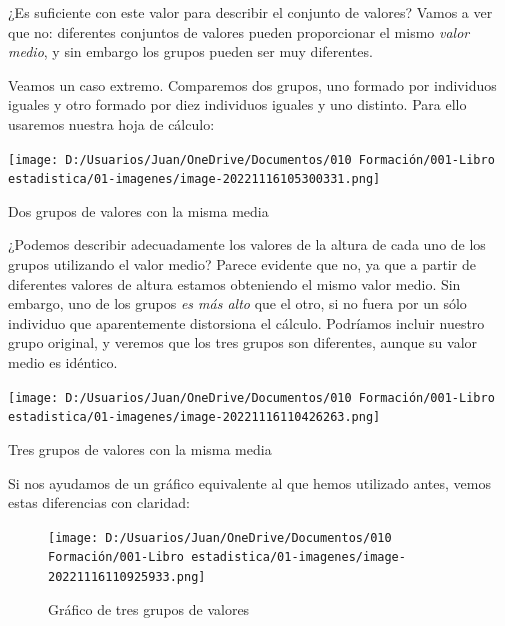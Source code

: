 \documentclass[
  letterpaper,
  DIV=11,
  numbers=noendperiod,
  oneside]{scrreprt}
\begin{document}
¿Es suficiente con este valor para describir el conjunto de valores?
Vamos a ver que no: diferentes conjuntos de valores pueden proporcionar
el mismo \emph{valor medio}, y sin embargo los grupos pueden ser muy
diferentes.

Veamos un caso extremo. Comparemos dos grupos, uno formado por
individuos iguales y otro formado por diez individuos iguales y uno
distinto. Para ello usaremos nuestra hoja de cálculo:

\begin{marginfigure}

{\centering \texttt{[image: D:/Usuarios/Juan/OneDrive/Documentos/010 Formación/001-Libro estadistica/01-imagenes/image-20221116105300331.png]}

}

\caption{Dos grupos de valores con la misma media}

\end{marginfigure}

¿Podemos describir adecuadamente los valores de la altura de cada uno de
los grupos utilizando el valor medio? Parece evidente que no, ya que a
partir de diferentes valores de altura estamos obteniendo el mismo valor
medio. Sin embargo, uno de los grupos \emph{es más alto} que el otro, si
no fuera por un sólo individuo que aparentemente distorsiona el cálculo.
Podríamos incluir nuestro grupo original, y veremos que los tres grupos
son diferentes, aunque su valor medio es idéntico.

\begin{marginfigure}

{\centering \texttt{[image: D:/Usuarios/Juan/OneDrive/Documentos/010 Formación/001-Libro estadistica/01-imagenes/image-20221116110426263.png]}

}

\caption{Tres grupos de valores con la misma media}

\end{marginfigure}

Si nos ayudamos de un gráfico equivalente al que hemos utilizado antes,
vemos estas diferencias con claridad:

\begin{figure}

{\centering \texttt{[image: D:/Usuarios/Juan/OneDrive/Documentos/010 Formación/001-Libro estadistica/01-imagenes/image-20221116110925933.png]}

}

\caption{Gráfico de tres grupos de valores}

\end{figure}
\end{document}
